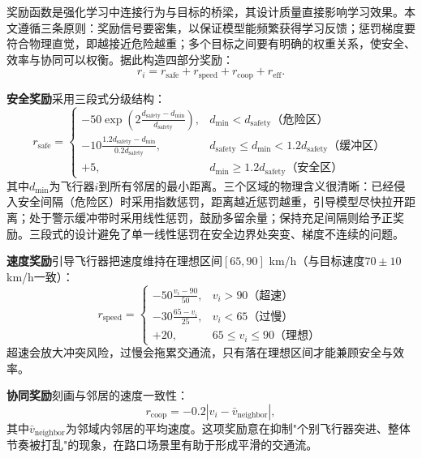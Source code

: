 \documentclass[12pt,a4paper,UTF8]{ctexart}
\begin{document}
奖励函数是强化学习中连接行为与目标的桥梁，其设计质量直接影响学习效果。本文遵循三条原则：奖励信号要密集，以保证模型能频繁获得学习反馈；惩罚梯度要符合物理直觉，即越接近危险越重；多个目标之间要有明确的权重关系，使安全、效率与协同可以权衡。据此构造四部分奖励：
\begin{equation}
    r_i = r_{\text{safe}} + r_{\text{speed}} + r_{\text{coop}} + r_{\text{eff}}.
    \label{eq:reward_total}
\end{equation}

\textbf{安全奖励}采用三段式分级结构：
\begin{equation}
    r_{\text{safe}} = \begin{cases}
        -50 \exp\!\left(2\frac{d_{\text{safety}}-d_{\min}}{d_{\text{safety}}}\right), & d_{\min}<d_{\text{safety}} \text{（危险区）}\\
        -10 \frac{1.2d_{\text{safety}}-d_{\min}}{0.2d_{\text{safety}}}, & d_{\text{safety}}\leq d_{\min}<1.2d_{\text{safety}} \text{（缓冲区）}\\
        +5, & d_{\min}\geq1.2d_{\text{safety}} \text{（安全区）}
    \end{cases}
    \label{eq:reward_safe}
\end{equation}
其中$d_{\min}$为飞行器$i$到所有邻居的最小距离。三个区域的物理含义很清晰：已经侵入安全间隔（危险区）时采用指数惩罚，距离越近惩罚越重，引导模型尽快拉开距离；处于警示缓冲带时采用线性惩罚，鼓励多留余量；保持充足间隔则给予正奖励。三段式的设计避免了单一线性惩罚在安全边界处突变、梯度不连续的问题。

\textbf{速度奖励}引导飞行器把速度维持在理想区间$[65,90]$ km/h（与目标速度$70\pm10$ km/h一致）：
\begin{equation}
    r_{\text{speed}} = \begin{cases}
        -50\frac{v_i-90}{50}, & v_i>90 \text{（超速）}\\
        -30\frac{65-v_i}{25}, & v_i<65 \text{（过慢）}\\
        +20, & 65\leq v_i\leq 90 \text{（理想）}
    \end{cases}
    \label{eq:reward_speed}
\end{equation}
超速会放大冲突风险，过慢会拖累交通流，只有落在理想区间才能兼顾安全与效率。

\textbf{协同奖励}刻画与邻居的速度一致性：
\begin{equation}
    r_{\text{coop}} = -0.2\left|v_i - \bar{v}_{\text{neighbor}}\right|,
    \label{eq:reward_coop}
\end{equation}
其中$\bar{v}_{\text{neighbor}}$为邻域内邻居的平均速度。这项奖励意在抑制"个别飞行器突进、整体节奏被打乱"的现象，在路口场景里有助于形成平滑的交通流。
\end{document}
